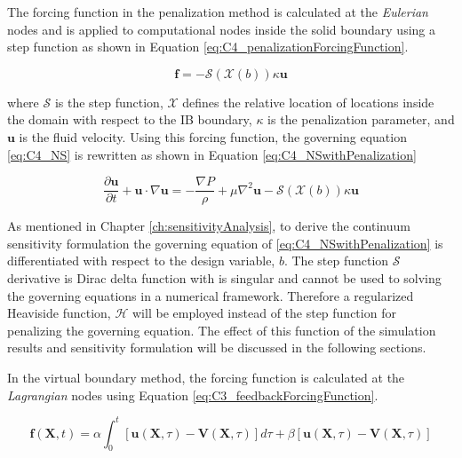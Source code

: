 The forcing function in the penalization method is calculated at the \emph{Eulerian} nodes and is applied to computational nodes inside the solid boundary using a step function as shown in Equation \eqref{eq:C4_penalizationForcingFunction}.

\begin{equation}\label{eq:C4_penalizationForcingFunction}
	\mathbf{f} = -\mathcal{S}(\mathcal{X}(b)) \kappa \mathbf{u}
\end{equation}

where $\mathcal{S}$ is the step function, $\mathcal{X}$ defines the relative location of locations inside the domain with respect to the IB boundary, $\kappa$ is the penalization parameter, and $\mathbf{u}$ is the fluid velocity. Using this forcing function, the governing equation \eqref{eq:C4_NS} is rewritten as shown in Equation \eqref{eq:C4_NSwithPenalization}

\begin{equation}\label{eq:C4_NSwithPenalization}
	\frac{\partial \mathbf{u}}{\partial t} + \mathbf{u} \cdot \nabla \mathbf{u} = 
	-\frac{\nabla P}{\rho} + \mu \nabla^2 \mathbf{u} -\mathcal{S}(\mathcal{X}(b)) \kappa \mathbf{u}
\end{equation}

As mentioned in Chapter \ref{ch:sensitivityAnalysis}, to derive the continuum sensitivity formulation the governing equation of \eqref{eq:C4_NSwithPenalization} is differentiated with respect to the design variable, $b$. The step function $\mathcal{S}$ derivative is Dirac delta function with is singular and cannot be used to solving the governing equations in a numerical framework. Therefore a regularized Heaviside function, $\mathcal{H}$ will be employed instead of the step function for penalizing the governing equation. The effect of this function of the simulation results and sensitivity formulation will be discussed in the following sections.

In the virtual boundary method, the forcing function is calculated at the \emph{Lagrangian} nodes using Equation \eqref{eq:C3_feedbackForcingFunction}.

\begin{equation}\label{eq:C3_feedbackForcingFunction}
	\mathbf{f}(\mathbf{X}, t) = 
	\alpha \int_0^t \left[ \mathbf{u}(\mathbf{X}, \tau) - \mathbf{V}(\mathbf{X}, \tau) \right] d\tau + 
	\beta \left[ \mathbf{u}(\mathbf{X}, \tau) - \mathbf{V}(\mathbf{X}, \tau) \right]
\end{equation}


